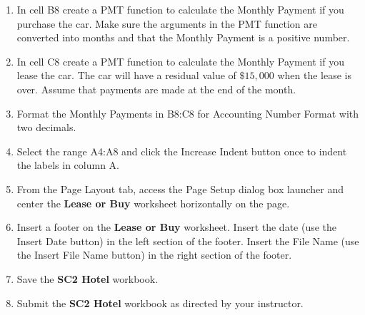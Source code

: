 \begin{enumerate}[resume]
	\item In cell \textsf{B8} create a PMT function to calculate the Monthly Payment if you purchase the car. Make sure the arguments in the PMT function are converted into months and that the Monthly Payment is a positive number.
	
	\item In cell \textsf{C8} create a PMT function to calculate the Monthly Payment if you lease the car. The car will have a residual value of $ \$15,000 $ when the lease is over. Assume that payments are made at the end of the month.
	
	\item Format the Monthly Payments in \textsf{B8:C8} for Accounting Number Format with two decimals.
	
	\item Select the range \textsf{A4:A8} and click the Increase Indent button once to indent the labels in column A.
	
	\item From the Page Layout tab, access the Page Setup dialog box launcher and center the \textbf{Lease or Buy} worksheet horizontally on the page.
	
	\item Insert a footer on the \textbf{Lease or Buy} worksheet. Insert the date (use the Insert Date button) in the left section of the footer. Insert the File Name (use the Insert File Name button) in the right section of the footer.
	
	\item Save the \textbf{SC2 Hotel} workbook.
	
	\item Submit the \textbf{SC2 Hotel} workbook as directed by your instructor.
\end{enumerate}